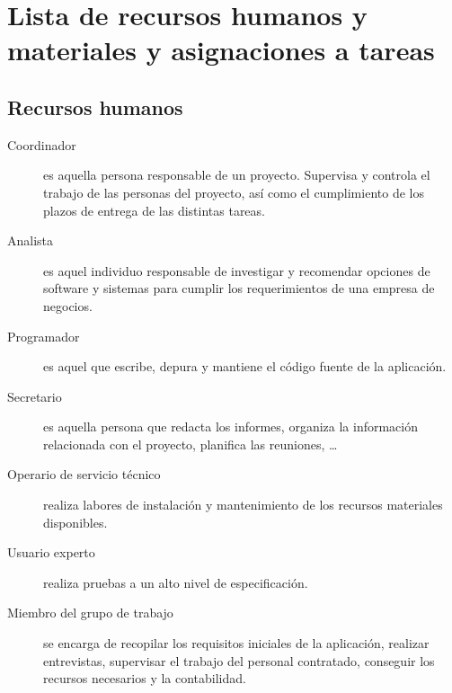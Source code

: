 \documentclass[11pt,a4paper,spanish,twoside]{book}
\begin{document}
\section{Lista de recursos humanos y materiales y asignaciones a 
  tareas}

\subsection{Recursos humanos}
\begin{description}
\item[Coordinador] es aquella persona responsable de un proyecto. Supervisa y
  controla el trabajo de las personas del proyecto, así como el cumplimiento
  de los plazos de entrega de las distintas tareas. 

\item[Analista] es aquel individuo responsable de investigar y
  recomendar opciones de software y sistemas para cumplir los requerimientos
  de una empresa de negocios.  

\item[Programador] es aquel que escribe, depura y mantiene el código fuente
  de la aplicación.  

\item[Secretario] es aquella persona que redacta los informes, organiza la
  información relacionada con el proyecto, planifica las reuniones, \dots

\item[Operario de servicio técnico] realiza labores de instalación y
  mantenimiento de los recursos materiales disponibles.

\item[Usuario experto] realiza pruebas a un alto nivel de especificación.

\item[Miembro del grupo de trabajo] se encarga de recopilar los requisitos
  iniciales de la aplicación, realizar entrevistas, supervisar el trabajo del
  personal  contratado, conseguir los recursos necesarios y la contabilidad.  

\end{description}
\end{document}
